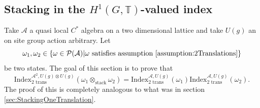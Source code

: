 \documentclass[12pt,a4paper,twoside]{article}
\newcommand{\PP}{\mathcal P}
\newcommand{\TT}{\mathbb T}
\renewcommand{\AA}{\mathcal A}
\theoremstyle{definition}
\numberwithin{equation}{section}
\begin{document}
\subsection{Stacking in the $H^1(G,\TT)$-valued index}\label{sec:StackingTwoTranslations}
Take $\AA$ a quasi local $C^*$ algebra on a two dimensional lattice and take $U(g)$ an on site group action arbitrary. Let
\begin{equation}
	\omega_1,\omega_2\in\{\omega\in\PP(\AA)| \omega\text{ satisfies assumption \ref{assumption:2Translations}}\}
\end{equation}
be two states. The goal of this section is to prove that
\begin{equation}\label{eq:IndexMorphismUnderStackingTwoTranslations}
	\textrm{Index}^{\AA^2,U(g)\otimes U(g)}_{\text{2 trans}}(\omega_1\otimes_{\text{stack}}\omega_2)=\textrm{Index}^{\AA,U(g)}_{\text{2 trans}}(\omega_1)\textrm{Index}^{\AA,U(g)}_{\text{2 trans}}(\omega_2).
\end{equation}
The proof of this is completely analogous to what was in section \ref{sec:StackingOneTranslation}.
\clearpage
\appendix
\end{document}
